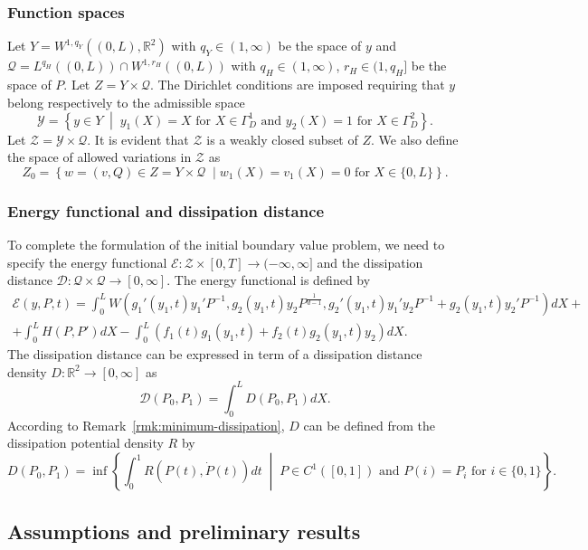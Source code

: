 \documentclass[a4paper,10pt,twoside]{amsbook}
\numberwithin{section}{chapter}
\numberwithin{equation}{chapter}
\theoremstyle{definition}
\begin{document}
\subsubsection*{Function spaces}

Let $Y=W^{1,q_Y}((0,L),\mathbb{R}^2)$ with $q_Y\in(1,\infty)$ be the space of $y$ and $\mathscr{Q}=L^{q_H}((0,L))\cap W^{1,r_H}((0,L))$ with $q_H\in(1,\infty)$, $r_H\in(1,q_H]$ be the space of $P$. Let $Z=Y\times\mathscr{Q}$. The Dirichlet conditions are imposed requiring that $y$ belong respectively to the admissible space
\[
\mathscr{Y}=\left\{y\in Y\;\middle|\;\text{$y_1(X)=X$ for $X\in\Gamma_D^1$ and $y_2(X)=1$ for $X\in\Gamma_D^2$}\right\}.
\]
Let $\mathscr{Z}=\mathscr{Y}\times\mathscr{Q}$. It is evident that $\mathscr{Z}$ is a weakly closed subset of $Z$. We also define the space of allowed variations in $\mathscr{Z}$ as
\[
Z_0=\left\{w=(v,Q)\in Z=Y\times\mathscr{Q}\;\middle|\text{$w_1(X)=v_1(X)=0$ for $X\in\{0,L\}$}\right\}.
\]

\subsubsection*{Energy functional and dissipation distance}

To complete the formulation of the initial boundary value problem, we need to specify the energy functional $\mathcal{E}\colon\mathscr{Z}\times[0,T]\to(-\infty,\infty]$ and the dissipation distance $\mathcal{D}\colon\mathscr{Q}\times\mathscr{Q}\to[0,\infty]$. The energy functional is defined by
\begin{multline*}
\mathcal{E}(y,P,t)=\int_0^L W\left(g_1'(y_1,t)y_1'P^{-1},g_2(y_1,t)y_2P^\frac{1}{d-1},g_2'(y_1,t)y_1'y_2P^{-1}+g_2(y_1,t)y_2'P^{-1}\right)dX+\\
+\int_0^LH(P,P')dX-\int_0^L\left(f_1(t)g_1(y_1,t)+f_2(t)g_2(y_1,t)y_2\right)dX.
\end{multline*}
The dissipation distance can be expressed in term of a dissipation distance density $D\colon\mathbb{R}^2\to[0,\infty]$ as
\[
\mathcal{D}(P_0,P_1)=\int_0^LD(P_0,P_1)dX.
\]
According to Remark~\ref{rmk:minimum-dissipation}, $D$ can be defined from the dissipation potential density $R$ by
\begin{equation}
\label{eqn:dissipation-distance-density}
D(P_0,P_1)=\inf\left\{\int_0^1R(P(t),\dot{P}(t))dt\;\middle|\;\text{$P\in C^1([0,1])$ and $P(i)=P_i$ for $i\in\{0,1\}$}\right\}.
\end{equation}

\subsection{Assumptions and preliminary results}
\end{document}
